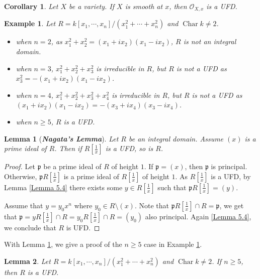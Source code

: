 \documentclass{ctexart}
\newtheorem{lemma}{Lemma}[section]
\newtheorem{example}{Example}[section]
\newtheorem{corollary}{Corollary}[section]
\newcommand{\characteristic}{\operatorname{Char}}
\begin{document}
\begin{corollary}
    Let $X$ be a variety.
    If $X$ is smooth at $x$, then $\mathcal{O}_{X, x}$ is a UFD.
    \label{Corollary 5.2}
\end{corollary}
\begin{example}
    Let $R = k[x_{1}, \cdots, x_{n}]/(x_{1}^{2} + \cdots + x_{n}^{2})$ and $\characteristic k \neq 2$.
    \begin{itemize}
        \item when $n = 2$, as $x_{1}^{2} + x_{2}^{2} = (x_{1} + ix_{2})(x_{1} - ix_{2})$, $R$ is not an integral domain.
        \item when $n = 3$, $x_{1}^{2} + x_{2}^{2} + x_{3}^{2}$ is irreducible in $R$, 
        but $R$ is not a UFD as $x_{3}^{2} = -(x_{1} + ix_{2})(x_{1} - ix_{2})$.
        \item when $n = 4$, $x_{1}^{2} + x_{2}^{2} + x_{3}^{2} + x_{4}^{2}$ is irreducible in $R$,
        but $R$ is not a UFD as $(x_{1} + ix_{2})(x_{1} - ix_{2}) = -(x_{3} + ix_{4})(x_{3} - ix_{4})$.
        \item when $n \ge 5$, $R$ is a UFD.
    \end{itemize} 
    \label{example:singularity_of_quotient_ring_by_square_sum}
\end{example}
\begin{lemma}[\textbf{\emph{Nagata's Lemma}}]
    Let $R$ be an integral domain.
    Assume $(x)$ is a prime ideal of $R$.
    Then if $R[\frac{1}{x}]$ is a UFD, so is $R$.
    \label{Lemma 5.5}
\end{lemma}
\begin{proof}
    Let $\mathfrak{p}$ be a prime ideal of $R$ of height $1$.
    If $\mathfrak{p} = (x)$, then $\mathfrak{p}$ is principal.
    Otherwise, $\mathfrak{p}R[\frac{1}{x}]$ is a prime ideal of $R[\frac{1}{x}]$ of height $1$.
    As $R[\frac{1}{x}]$ is a UFD, by Lemma \ref{Lemma 5.4} there exists some $y\in R[\frac{1}{x}]$ such that $\mathfrak{p}R[\frac{1}{x}] = (y)$.
    \par
    Assume that $y = y_{0}x^{n}$ where $y_{0}\in R \setminus (x)$.
    Note that $\mathfrak{p}R[\frac{1}{x}] \cap R = \mathfrak{p}$, 
    we get that $\mathfrak{p} = yR[\frac{1}{x}] \cap R = y_{0}R[\frac{1}{x}] \cap R = (y_{0})$ also principal.
    Again \ref{Lemma 5.4}, we conclude that $R$ is UFD.
\end{proof}
With Lemma \ref{Lemma 5.5}, we give a proof of the $n \ge 5$ case in Example \ref{example:singularity_of_quotient_ring_by_square_sum}.
\begin{lemma}
    Let $R = k[x_{1}, \cdots, x_{n}]/(x_{1}^{2} + \cdots + x_{n}^{2})$ and $\characteristic k \neq 2$.
    If $n \ge 5$, then $R$ is a UFD.
    \label{Lemma 5.6}
\end{lemma}
\end{document}
